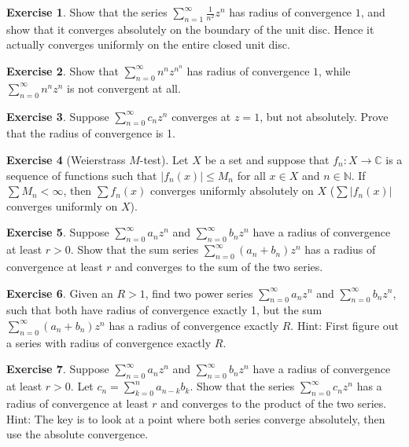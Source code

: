 \documentclass[12pt,openany]{book}
\newcommand{\sabs}[1]{\lvert {#1} \rvert}
\newcommand{\abs}[1]{\left\lvert {#1} \right\rvert}
\newcommand{\C}{{\mathbb{C}}}
\newcommand{\N}{{\mathbb{N}}}
\theoremstyle{plain}
\theoremstyle{remark}
\theoremstyle{definition}
\newenvironment{exbox}{%
    \def\FrameCommand{\vrule width 1pt \relax\hspace{10pt}}%
    \MakeFramed{\advance\hsize-\width\FrameRestore}%
}{%
    \endMakeFramed
}
\theoremstyle{exercise}
\newtheorem{exercise}{Exercise}[section]
\theoremstyle{example}
\begin{document}
\begin{exbox}
\begin{exercise}
Show that the series $\sum_{n=1}^\infty \frac{1}{n^2} z^{n}$ has radius of
convergence $1$, and
show that it converges absolutely on the boundary of the unit disc.  Hence
it actually converges uniformly on the entire closed unit disc.
\end{exercise}

\begin{exercise}
Show that
$\sum_{n=0}^\infty n^n z^{n^n}$ has radius of convergence $1$,
while
$\sum_{n=0}^\infty n^n z^{n}$ is not convergent at all.
\end{exercise}

\begin{exercise}
Suppose
$\sum_{n=0}^\infty c_n z^{n}$ converges at $z=1$, but not absolutely.
Prove that the radius of convergence is 1.
\end{exercise}

\begin{exercise}[Weierstrass $M$-test]
\label{exercise:weierMtest}
Let $X$ be a set and suppose that $f_n \colon X \to \C$ is
a sequence of functions such that
$\abs{f_n(x)} \leq M_n$ for all $x \in X$ and $n \in \N$.  If $\sum M_n <
\infty$, then $\sum f_n(x)$ converges uniformly absolutely on $X$
($\sum \sabs{f_n(x)}$ converges uniformly on $X$).
\end{exercise}

\begin{exercise}
Suppose
$\sum_{n=0}^\infty a_n z^{n}$ and $\sum_{n=0}^\infty b_n z^{n}$
have a radius of convergence at least $r > 0$.  Show that
the sum series
$\sum_{n=0}^\infty (a_n+b_n) z^{n}$ has a radius of convergence at least
$r$ and converges to the sum of the two series.
\end{exercise}

\begin{exercise}
Given an $R > 1$, find two power series
$\sum_{n=0}^\infty a_n z^{n}$ and $\sum_{n=0}^\infty b_n z^{n}$,
such that both have radius of convergence exactly 1, but the 
sum
$\sum_{n=0}^\infty (a_n+b_n) z^{n}$ has a radius of convergence 
exactly $R$.  Hint: First figure out a series with radius of convergence
exactly $R$.
\end{exercise}

\begin{exercise}
Suppose
$\sum_{n=0}^\infty a_n z^{n}$ and $\sum_{n=0}^\infty b_n z^{n}$
have a radius of convergence at least $r > 0$.  Let 
$c_n = \sum_{k=0}^n a_{n-k}b_k$.  Show that
the series
$\sum_{n=0}^\infty c_n z^{n}$ has a radius of convergence at least
$r$ and converges to the product of the two series.
Hint: The key is to look at a point where both series converge absolutely,
then use the absolute convergence.
\end{exercise}
\end{exbox}
\end{document}
